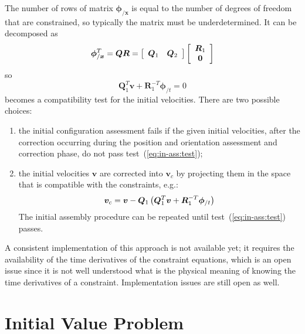 \documentclass[10pt,dvips,fleqn,subeqn]{report}
\newcommand{\T}[1]{\bm{#1}}
\begin{document}
\begin{itemize}
The number of rows of matrix $\T{\phi}_{/\T{x}}$ is equal to the number 
of degrees of freedom that are constrained, so typically the matrix 
must be underdetermined.
It can be decomposed as
\begin{equation}
	\T{\phi}_{/\T{x}}^T = \T{Q} \T{R}
		= \sqbr{\matr{cc}{\T{Q}_1 & \T{Q}_2}}\sqbr{\cvvect{\T{R}_1 \\ \T{0}}}
\end{equation}
so
\begin{equation}
	\T{Q}_1^T \T{v} + \T{R}_1^{-T} \T{\phi}_{/t} = 0
	\label{eq:in-ass:test}
\end{equation}
becomes a compatibility test for the initial velocities.
There are two possible choices:
\begin{enumerate}
\item the initial configuration assessment fails if the given 
initial velocities, after the correction occurring during the position 
and orientation assessment and correction phase, do not pass 
test~(\ref{eq:in-ass:test});
\item the initial velocities $\T{v}$ are corrected into $\T{v}_c$ 
by projecting them in the space that is compatible with the constraints, 
e.g.:
\begin{equation}
	\T{v}_c = \T{v} - \T{Q}_1 \plbr{\T{Q}_1^T \T{v} + \T{R}_1^{-T}\T{\phi}_{/t}}
\end{equation}
The initial assembly procedure can be repeated until 
test~(\ref{eq:in-ass:test}) passes.
\end{enumerate}
\end{itemize}
A consistent implementation of this approach is not available yet;
it requires the availability of the time derivatives 
of the constraint equations, which is an open issue since it is not
well understood what is the physical meaning of knowing 
the time derivatives of a constraint.
Implementation issues are still open as well.


\section{Initial Value Problem}
\end{document}
